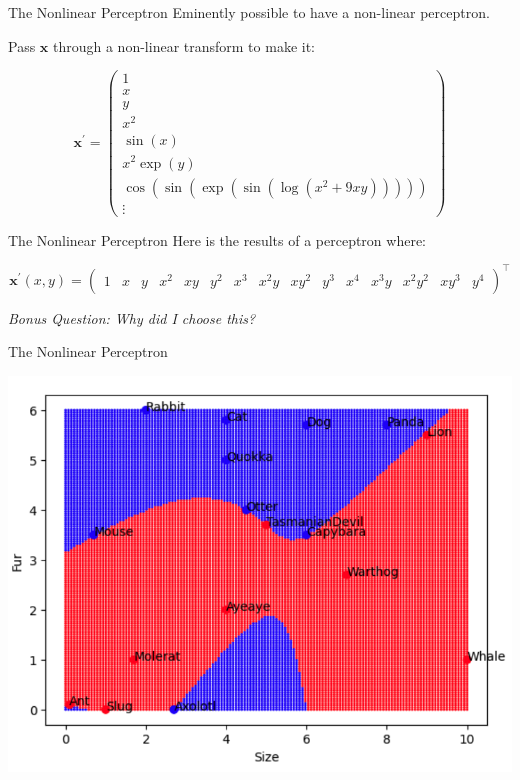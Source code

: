 \documentclass[]{SangerLibrary/sanger-present}
\renewcommand\vec[1]{\boldsymbol{\mathbf{#1}}}
\begin{document}
	\begin{frame}{The Nonlinear Perceptron}
		Eminently possible to have a non-linear perceptron. 
		
		\pause Pass $\vec{x}$ through a non-linear transform to make it:

		\begin{equation}
			\vec{x}^\prime = \begin{pmatrix}
				1 \\ x \\ y \\ x^2 \\ \sin(x) \\ x^2 \exp(y) \\ \cos(\sin(\exp(\sin(\log(x^2 + 9 xy))))) \\ \vdots \end{pmatrix}
		\end{equation}

	\end{frame}

	\begin{frame}{The Nonlinear Perceptron}
		Here is the results of a perceptron where:

		\setcounter{MaxMatrixCols}{20}
		\begin{equation}
			\vec{x}^\prime(x,y) = \begin{pmatrix}
				1 & x & y & x^2 & xy & y^2 & x^3 & x^2y & xy^2 & y^3 & x^4 & x^3y & x^2y^2 & xy^3 & y^4
			\end{pmatrix}^\intercal
		\end{equation}


		\textit{Bonus Question: Why did I choose this?}

	\end{frame}

	\begin{frame}{The Nonlinear Perceptron}
		

		{\centering \includegraphics[width=0.8\linewidth,height=0.8\paperheight,keepaspectratio=true]{NonLinear.png}}

	\end{frame}
\end{document}
